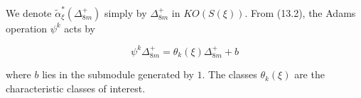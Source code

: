 We denote $\tilde{\alpha}^*_{\xi}(\Delta^+_{8m})$ simply by $\Delta^+_{8m}$ in $KO(S(\xi))$. From (13.2), the Adams operation $\psi^k$ acts by

$$
\psi^k \Delta^+_{8m} = \theta_k(\xi) \Delta^+_{8m} + b
$$

where $b$ lies in the submodule generated by $1$. The classes $\theta_k(\xi)$ are the characteristic classes of interest.
